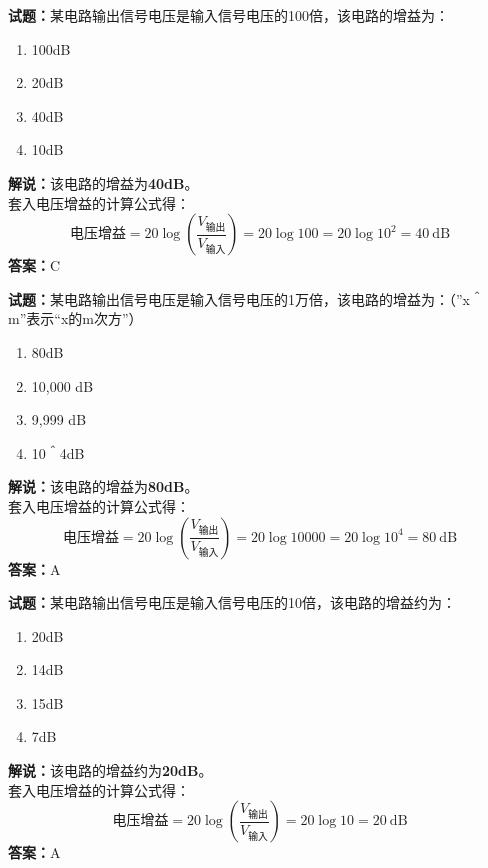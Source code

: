 \documentclass{ctexbook}
\begin{document}
\bigskip


\noindent\textbf{试题：}某电路输出信号电压是输入信号电压的100倍，该电路的增益为：
\begin{enumerate}[leftmargin=3em]
\item 100dB
\item 20dB
\item 40dB
\item 10dB
\end{enumerate}
\noindent\textbf{解说：}该电路的增益为\textbf{40dB}。\\
套入电压增益的计算公式得：
$$\mbox{电压增益}=20 \log \left( {\frac{V_{ \mbox{输出} }}{V_{ \mbox{输入} }}} \right)=20 \log 100=20 \log 10^2= 40 \ \mathrm{dB}$$
\noindent\textbf{答案：}C




\bigskip


\noindent\textbf{试题：}某电路输出信号电压是输入信号电压的1万倍，该电路的增益为：（”x＾m”表示“x的m次方”）
\begin{enumerate}[leftmargin=3em]
\item 80dB
\item 10,000 dB
\item 9,999 dB
\item 10＾4dB
\end{enumerate}
\noindent\textbf{解说：}该电路的增益为\textbf{80dB}。\\
套入电压增益的计算公式得：
$$\mbox{电压增益}=20 \log \left( {\frac{V_{ \mbox{输出} }}{V_{ \mbox{输入} }}} \right)=20 \log 10000=20 \log 10^4= 80 \ \mathrm{dB}$$
\noindent\textbf{答案：}A



\bigskip


\noindent\textbf{试题：}某电路输出信号电压是输入信号电压的10倍，该电路的增益约为：
\begin{enumerate}[leftmargin=3em]
\item 20dB
\item 14dB
\item 15dB
\item 7dB
\end{enumerate}
\noindent\textbf{解说：}该电路的增益约为\textbf{20dB}。\\
套入电压增益的计算公式得：
$$\mbox{电压增益}=20 \log \left( {\frac{V_{ \mbox{输出} }}{V_{ \mbox{输入} }}} \right)=20 \log 10=20 \ \mathrm{dB}$$
\noindent\textbf{答案：}A



\bigskip
\end{document}
